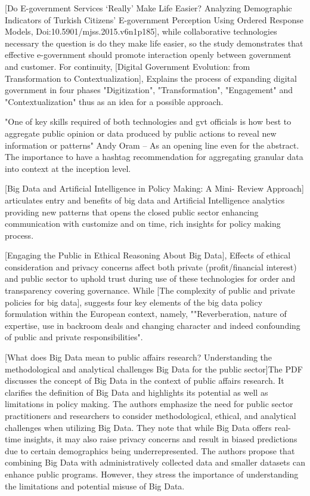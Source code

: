 [Do E-government Services ‘Really’ Make Life Easier? Analyzing Demographic Indicators of Turkish Citizens’ E-government Perception Using Ordered Response Models, Doi:10.5901/mjss.2015.v6n1p185], while collaborative technologies necessary the question is do they make life easier, so the study demonstrates that effective e-government should promote interaction openly between government and customer.  For continuity, [Digital Government Evolution: from Transformation to Contextualization], Explains the process of expanding digital government in four phases "Digitization", "Transformation", "Engagement" and "Contextualization" thus as an idea for a possible approach. 

"One of key skills required of both technologies and gvt officials is how best to aggregate public opinion or data produced by public actions to reveal new information or patterns" Andy Oram  -- As an opening line even for the abstract.  The importance to have a hashtag recommendation for aggregating granular data into context at the inception level.  

[Big Data and Artificial Intelligence in Policy Making: A Mini- Review Approach] articulates entry and benefits of big data and Artificial Intelligence analytics providing new patterns that opens the closed public sector enhancing communication with customize and on time, rich insights for policy making process.  

[Engaging the Public in Ethical Reasoning About Big Data], Effects of ethical consideration and privacy concerns affect both private (profit/financial interest) and public sector to uphold trust during use of these technologies for order and transparency covering governance.  While  [The complexity of public and private policies for big data], suggests four key elements of the big data policy formulation within the European context, namely, ""Reverberation, nature of expertise, use in backroom deals and changing character and indeed confounding of public and private responsibilities".  

[What does Big Data mean to public affairs research? Understanding the methodological and analytical challenges Big Data for the public sector]The PDF discusses the concept of Big Data in the context of public affairs research. It clarifies the definition of Big Data and highlights its potential as well as limitations in policy making.  The authors emphasize the need for public sector practitioners and researchers to consider methodological, ethical, and analytical challenges when utilizing Big Data. They note that while Big Data offers real-time insights, it may also raise privacy concerns and result in biased predictions due to certain demographics being underrepresented. The authors propose that combining Big Data with administratively collected data and smaller datasets can enhance public programs. However, they stress the importance of understanding the limitations and potential misuse of Big Data.

